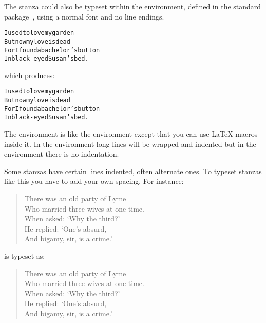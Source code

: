 \begin{verse}  
\garden
\end{verse}


The stanza could also be typeset within the  environment, defined
in the standard  package~\cite{ALLTT}, 
using a normal font and no \cmd{\\} line endings.
\begin{lcode}
\begin{alltt}\normalfont
I used to love my garden 
But now my love is dead 
For I found a bachelor's button 
In black-eyed Susan's bed.
\end{alltt}
\end{lcode}
which produces:

\begin{alltt}\normalfont
I used to love my garden 
But now my love is dead 
For I found a bachelor's button 
In black-eyed Susan's bed.
\end{alltt}

The  environment is like the  environment except that
you can use LaTeX macros inside it. 
   In the  environment long lines  
will be wrapped and indented
but in the  environment there is no indentation. 

Some stanzas have certain lines indented, 
often alternate ones. To
typeset stanzas like this you have to add your own spacing. For
instance:
\begin{lcode}
\begin{verse}
There was an old party of Lyme \\
Who married three wives at one time. \\
\hspace{2em} When asked: `Why the third?' \\
\hspace{2em} He replied: `One's absurd, \\
And bigamy, sir, is a crime.'
\end{verse}
\end{lcode}
is typeset as: 
\begin{verse}
There was an old party of Lyme \\
Who married three wives at one time. \\
\hspace{2em} When asked: `Why the third?' \\
\hspace{2em} He replied: `One's absurd, \\
And bigamy, sir, is a crime.'
\end{verse}
\vspace{\onelineskip}

